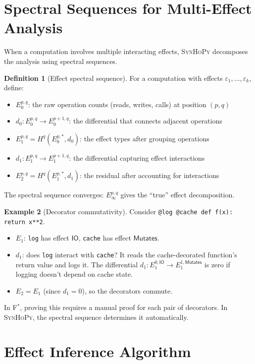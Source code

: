 \documentclass[11pt,a4paper]{report}
\theoremstyle{definition}
\newtheorem{definition}{Definition}[chapter]
\newtheorem{example}[definition]{Example}
\theoremstyle{plain}
\newcommand{\Mutates}{\mathsf{Mutates}}
\newcommand{\IO}{\mathsf{IO}}
\newcommand{\fstar}{F$^{*}$}
\newcommand{\synhopy}{\textsc{SynHoPy}}
\begin{document}
\section{Spectral Sequences for Multi-Effect Analysis}
\label{sec:spectral}

When a computation involves multiple interacting effects, \synhopy{} decomposes
the analysis using spectral sequences.

\begin{definition}[Effect spectral sequence]
For a computation with effects $\varepsilon_1, \ldots, \varepsilon_k$, define:
\begin{itemize}
  \item $E_0^{p,q}$: the raw operation counts (reads, writes, calls) at position $(p,q)$
  \item $d_0 : E_0^{p,q} \to E_0^{p+1,q}$: the differential that connects
    adjacent operations
  \item $E_1^{p,q} = H^q(E_0^{p,*}, d_0)$: the effect types after grouping operations
  \item $d_1 : E_1^{p,q} \to E_1^{p+1,q}$: the differential capturing effect interactions
  \item $E_2^{p,q} = H^q(E_1^{p,*}, d_1)$: the residual after accounting for interactions
\end{itemize}
The spectral sequence converges: $E_\infty^{p,q}$ gives the ``true'' effect
decomposition.
\end{definition}

\begin{example}[Decorator commutativity]
Consider \lstinline[style=python]{@log @cache def f(x): return x**2}.
\begin{itemize}
  \item $E_1$: \texttt{log} has effect $\IO$, \texttt{cache} has effect $\Mutates$.
  \item $d_1$: does \texttt{log} interact with \texttt{cache}? It reads the
    cache-decorated function's return value and logs it. The differential
    $d_1 : E_1^{0,\IO} \to E_1^{1,\Mutates}$ is zero if logging doesn't
    depend on cache state.
  \item $E_2 = E_1$ (since $d_1 = 0$), so the decorators commute.
\end{itemize}
In \fstar{}, proving this requires a manual proof for each pair of decorators.
In \synhopy{}, the spectral sequence determines it automatically.
\end{example}


\section{Effect Inference Algorithm}
\end{document}
